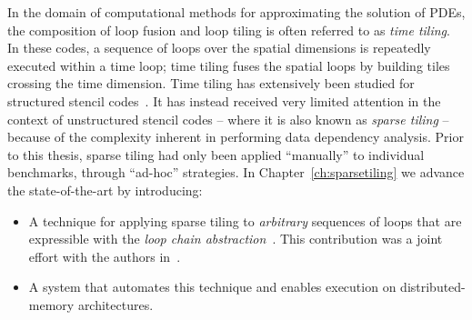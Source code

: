 In the domain of computational methods for approximating the solution of PDEs, the composition of loop fusion and loop tiling is often referred to as {\em time tiling}. In these codes, a sequence of loops over the spatial dimensions is repeatedly executed within a time loop; time tiling fuses the spatial loops by building tiles crossing the time dimension. Time tiling has extensively been studied for structured stencil codes~\citep{cohen-timetiling,ics-stencil-tiling,Zhou12,pluto}. It has instead received very limited attention in the context of unstructured stencil codes -- where it is also known as {\em sparse tiling} -- because of the complexity inherent in performing data dependency analysis. Prior to this thesis, sparse tiling had only been applied ``manually'' to individual benchmarks, through ``ad-hoc'' strategies. In Chapter~\ref{ch:sparsetiling} we advance the state-of-the-art by introducing:
\begin{itemize}
\item A technique for applying sparse tiling to {\it arbitrary} sequences of loops that are expressible with the {\em loop chain abstraction}~\citep{ST-KriegerHIPS2013}. This contribution was a joint effort with the authors in~\cite{st-paper}.
\item A system that automates this technique and enables execution on distributed-memory architectures.
\end{itemize}

